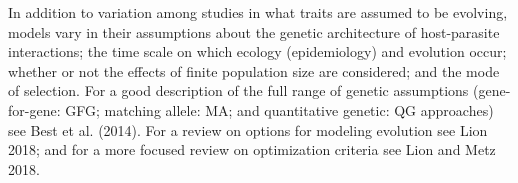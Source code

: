 In addition to variation among studies in what traits are assumed to be evolving, models vary in their assumptions about the genetic architecture of host-parasite interactions; the time scale on which ecology (epidemiology) and evolution occur; whether or not the effects of finite population size are considered; and the mode of selection. For a good description of the full range of genetic assumptions (gene-for-gene: GFG; matching allele: MA; and quantitative genetic: QG approaches) see Best et al. (2014). For a review on options for modeling evolution see Lion 2018; and for a more focused review on optimization criteria see Lion and Metz 2018.